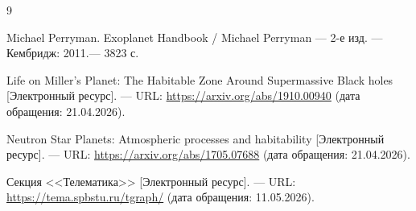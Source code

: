 \documentclass[14pt,a4paper]{extarticle}
\begin{document}
\newpage

\begin{thebibliography}{9}
\label{lit}

     Michael Perryman. Exoplanet Handbook / Michael Perryman --- 2-е изд. --- Кембридж: 2011.--- 3823 с.

	 Life on Miller's Planet: The Habitable Zone Around Supermassive Black holes [Электронный ресурс]. --- URL: \url{https://arxiv.org/abs/1910.00940} (дата обращения: 21.04.2026).

     Neutron Star Planets: Atmospheric processes and habitability [Электронный ресурс]. --- URL: \url{https://arxiv.org/abs/1705.07688} (дата обращения: 21.04.2026).

     Секция <<Телематика>> [Электронный ресурс]. --- URL: \url{https://tema.spbstu.ru/tgraph/} (дата обращения: 11.05.2026).

\end{thebibliography}

\newpage
\end{document}
